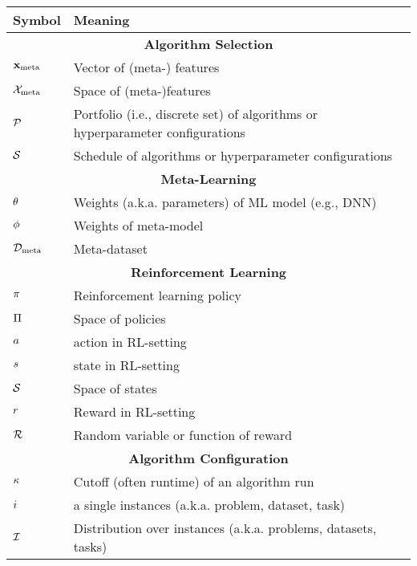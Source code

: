 \documentclass[]{report}
\begin{document}
\begin{table}
	\begin{tabular}{ll}
		\toprule
		Symbol & Meaning \\
		\midrule
		\multicolumn{2}{c}{\textbf{Algorithm Selection}}\\
		$\mathbf{x}_{\text{meta}}$ & Vector of (meta-) features\\
		$\mathcal{X}_{\text{meta}}$ & Space of (meta-)features \\
		$\mathcal{P}$ & Portfolio (i.e., discrete set) of algorithms or hyperparameter configurations\\
		$\mathcal{S}$ & Schedule of algorithms or hyperparameter configurations\\
		\midrule 
		\multicolumn{2}{c}{\textbf{Meta-Learning}}\\
		$\theta$ & Weights (a.k.a. parameters) of ML model (e.g., DNN)\\
		$\phi$ & Weights of meta-model\\
    	$\mathcal{D}_{\text{meta}}$ & Meta-dataset\\
		\midrule 
		\multicolumn{2}{c}{\textbf{Reinforcement Learning}}\\
		$\pi$ & Reinforcement learning policy\\
		$\Pi$ & Space of policies\\
		$a$ & action in RL-setting\\
		$s$ & state in RL-setting\\
		$\mathcal{S}$ & Space of states\\
		$r$ & Reward in RL-setting\\
		$\mathcal{R}$ & Random variable or function of reward\\
		\midrule
		\multicolumn{2}{c}{\textbf{Algorithm Configuration}}\\
		$\kappa$ & Cutoff (often runtime) of an algorithm run\\
		$i$ & a single instances (a.k.a. problem, dataset, task)\\
		$\mathcal{I}$ & Distribution over instances (a.k.a. problems, datasets, tasks)\\
		\bottomrule
	\end{tabular}
\end{table}
\end{document}
